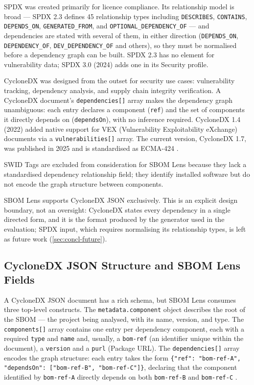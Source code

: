SPDX was created primarily for licence compliance. Its relationship model is broad --- SPDX 2.3 defines 45 relationship types including \texttt{DESCRIBES}, \texttt{CONTAINS}, \texttt{DEPENDS\_ON}, \texttt{GENERATED\_FROM}, and \texttt{OPTIONAL\_DEPENDENCY\_OF} --- and dependencies are stated with several of them, in either direction (\texttt{DEPENDS\_ON}, \texttt{DEPENDENCY\_OF}, \texttt{DEV\_DEPENDENCY\_OF} and others), so they must be normalised before a dependency graph can be built. SPDX 2.3 has no element for vulnerability data; SPDX 3.0 (2024) adds one in its Security profile.

CycloneDX was designed from the outset for security use cases: vulnerability tracking, dependency analysis, and supply chain integrity verification. A CycloneDX document's \texttt{dependencies[]} array makes the dependency graph unambiguous: each entry declares a component (\texttt{ref}) and the set of components it directly depends on (\texttt{dependsOn}), with no inference required. CycloneDX 1.4 (2022) added native support for VEX (Vulnerability Exploitability eXchange) documents via a \texttt{vulnerabilities[]} array. The current version, CycloneDX 1.7, was published in 2025 and is standardised as ECMA-424 \citep{OWASPCycloneDX}.

SWID Tags are excluded from consideration for SBOM Lens because they lack a standardised dependency relationship field; they identify installed software but do not encode the graph structure between components.

SBOM Lens supports CycloneDX JSON exclusively. This is an explicit design boundary, not an oversight: CycloneDX states every dependency in a single directed form, and it is the format produced by the generator used in the evaluation; SPDX input, which requires normalising its relationship types, is left as future work (\autoref{sec:concl-future}).


\subsection{CycloneDX JSON Structure and SBOM Lens Fields}
\label{sec:cyclonedx-structure}

A CycloneDX JSON document has a rich schema, but SBOM Lens consumes three top-level constructs. The \texttt{metadata.component} object describes the root of the SBOM --- the project being analysed, with its name, version, and type. The \texttt{components[]} array contains one entry per dependency component, each with a required \texttt{type} and \texttt{name} and, usually, a \texttt{bom-ref} (an identifier unique within the document), a \texttt{version} and a \texttt{purl} (Package URL). The \texttt{dependencies[]} array encodes the graph structure: each entry takes the form \texttt{\{"ref": "bom-ref-A", "dependsOn": ["bom-ref-B", "bom-ref-C"]\}}, declaring that the component identified by \texttt{bom-ref-A} directly depends on both \texttt{bom-ref-B} and \texttt{bom-ref-C} \citep{OWASPCycloneDX}.

